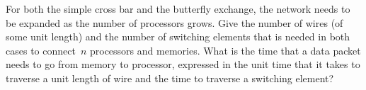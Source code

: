 For both the simple cross bar and the butterfly
exchange, the network needs to be expanded as the number of processors grows.
Give the number of wires (of some unit length) and the number of switching
elements that is needed in both cases to connect~$n$ processors and memories.
What is the time that a data packet needs to go from memory to processor,
expressed in the unit time that it takes to traverse a unit length of wire
and the time to traverse a switching element?
